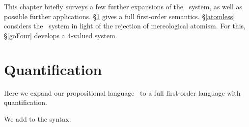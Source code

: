 


%


This chapter briefly surveys a few further expansions of the \GO\ system, as well as possible further applications. \S\ref{quantification} gives a full first-order semantics. \S\ref{atomless} considers the \GO\ system in light of the rejection of mereological atomism. For this, \S\ref{goFour} develops a 4-valued system. 

\section{Quantification}\label{quantification}

Here we expand our propositional language \GO\ to a full first-order language with quantification. 

We add to the syntax:

